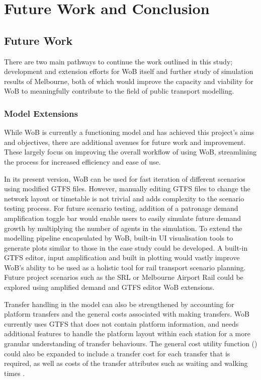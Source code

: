 \chapter{Future Work and Conclusion}
\label{chap:Conclusion}

\section{Future Work}
There are two main pathways to continue the work outlined in this study; development and extension efforts for WoB itself and further study of simulation results of Melbourne, both of which would improve the capacity and viability for WoB to meaningfully contribute to the field of public transport modelling. 


\subsection{Model Extensions}
While WoB is currently a functioning model and has achieved this project's aims and objectives, there are additional avenues for future work and improvement. These largely focus on improving the overall workflow of using WoB, streamlining the process for increased efficiency and ease of use. 

In its present version, WoB can be used for fast iteration of different scenarios using modified GTFS files. However, manually editing GTFS files to change the network layout or timetable is not trivial and adds complexity to the scenario testing process. For future scenario testing, addition of a patronage demand amplification toggle bar would enable users to easily simulate future demand growth by multiplying the number of agents in the simulation. To extend the modelling pipeline encapsulated by WoB, built-in UI visualisation tools to generate plots similar to those in the case study could be developed. A built-in GTFS editor, input amplification and built in plotting would vastly improve WoB's ability to be used as a holistic tool for rail transport scenario planning. Future project scenarios such as the SRL or Melbourne Airport Rail could be explored using amplified demand and GTFS editor WoB extensions. 

Transfer handling in the model can also be strengthened by accounting for platform transfers and the general costs associated with making transfers. WoB currently uses GTFS that does not contain platform information, and needs additional features to handle the platform layout within each station for a more granular understanding of transfer behaviours. The general cost utility function () could also be expanded to include a transfer cost for each transfer that is required, as well as costs of the transfer attributes such as waiting and walking times \cite{cascajoStatedPreferenceSurvey2017}.

